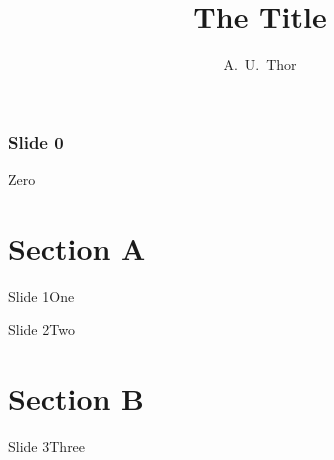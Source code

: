 \documentclass{beamer}
\title{The Title}
\author{A.~U.~Thor}
\begin{document}
\begin{frame}[plain]
    \titlepage
\end{frame}

\begin{frame}[plain]
    \frametitle{Slide 0}
    Zero
\end{frame}

\section{Section A}
\begin{frame}{Slide 1}One\end{frame}
\begin{frame}{Slide 2}Two\end{frame}

\section{Section B}
\begin{frame}{Slide 3}Three\end{frame}
\end{document}
